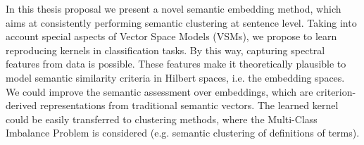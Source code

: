 In this thesis proposal we present a novel semantic embedding method, which aims at consistently performing semantic clustering at sentence level. Taking into account special aspects of Vector Space Models (VSMs), we propose to learn reproducing kernels in classification tasks. By this way, capturing spectral features from data is possible. These features make it theoretically plausible to model semantic similarity criteria in Hilbert spaces, i.e. the embedding spaces. We could improve the semantic assessment over embeddings, which are criterion-derived representations from traditional semantic vectors. The learned kernel could be easily transferred to clustering methods, where the Multi-Class Imbalance Problem is considered (e.g. semantic clustering of definitions of terms).
